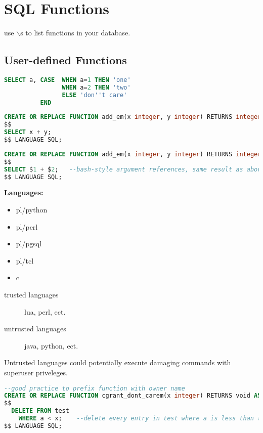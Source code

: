 \documentclass[12pt]{article}
\begin{document}
\section{SQL Functions}
use $\backslash$s to list functions in your database.
\subsection{User-defined Functions}
\begin{lstlisting}[language=sql]
SELECT a, CASE  WHEN a=1 THEN 'one'
                WHEN a=2 THEN 'two'
                ELSE 'don''t care'
          END
\end{lstlisting}


\begin{lstlisting}[language=sql, caption=example function]
CREATE OR REPLACE FUNCTION add_em(x integer, y integer) RETURNS integer AS
$$
SELECT x + y;
$$ LANGUAGE SQL;
\end{lstlisting}

\begin{lstlisting}[language=sql, caption=alternate argument reference style]
CREATE OR REPLACE FUNCTION add_em(x integer, y integer) RETURNS integer AS
$$
SELECT $1 + $2;   --bash-style argument references, same result as above
$$ LANGUAGE SQL;
\end{lstlisting}

\textbf{Languages:}
\begin{itemize}
  \item pl/python
  \item pl/perl
  \item pl/pgsql
  \item pl/tcl
  \item c
\end{itemize}

\begin{description}
  \item[trusted languages] lua, perl, ect.
  \item[untrusted languages] java, python, ect.
\end{description}
Untrusted languages could potentially execute damaging commands with superuser
priveleges.

\begin{lstlisting}[language=sql, caption=another function]
--good practice to prefix function with owner name
CREATE OR REPLACE FUNCTION cgrant_dont_carem(x integer) RETURNS void AS
$$
  DELETE FROM test
    WHERE a < x;    --delete every entry in test where a is less than the arg
$$ LANGUAGE SQL;
\end{lstlisting}
\end{document}
